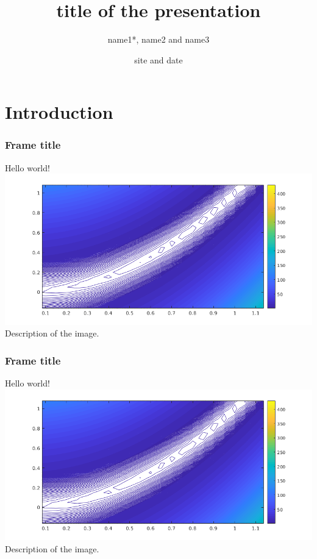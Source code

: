 \documentclass[aspectratio=169]{beamer}
\title{title of the presentation​​}
\author[name1, name2, name3]{name1*, name2 and name3}
\date[site]{site and date}
\begin{document}
\begin{frame}
 \titlepage 
\end{frame}

\section{Introduction}
\begin{frame}
 \frametitle{Frame title}
 Hello world!\\
 \includegraphics[scale=0.5]{images/rosenbrockzoom.png}\\
 Description of the image.
\end{frame}

\begin{frame}
 \frametitle{Frame title }
 Hello world!\\
 \includegraphics[scale=0.5]{images/rosenbrockzoom.png}\\
 Description of the image.
\end{frame}
\end{document}
